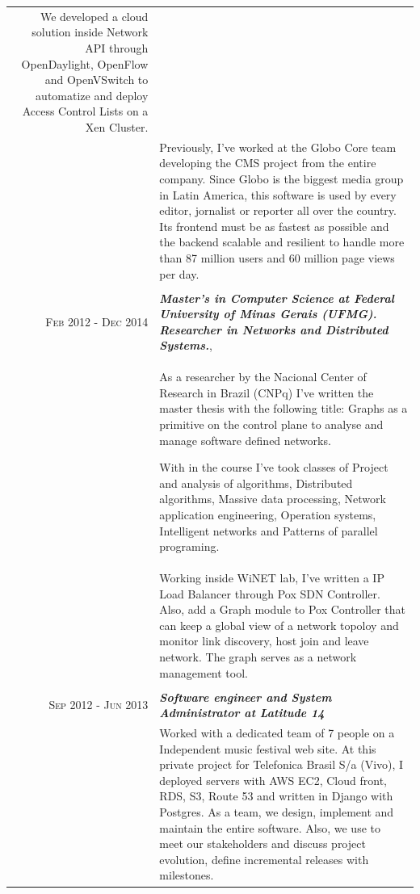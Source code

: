 \documentclass[a4paper,10pt]{article} %
\begin{document}
\begin{longtable}{r|p{11cm}}
{    We developed a cloud solution inside Network API through OpenDaylight,
    OpenFlow and OpenVSwitch to automatize and deploy Access Control Lists on a
    Xen Cluster.} \\

& \footnotesize{
    Previously, I've worked at the Globo Core team developing the CMS project
    from the entire company. Since Globo is the biggest media group in Latin
    America, this software is used by every editor, jornalist or reporter all
    over the country. Its frontend must be as fastest as possible and the
    backend scalable and resilient to handle more than 87 million users and 60
    million page views per day.} \\
\multicolumn{2}{c}{} \\


\textsc{Feb 2012 - Dec 2014} & \emph{\bf Master's in Computer Science at
Federal University of Minas Gerais (UFMG). Researcher in
Networks and Distributed Systems.}, \\
& \footnotesize{As a researcher by the Nacional Center of Research in Brazil
    (CNPq) I've written the master thesis with the following title: Graphs as
    a primitive on the control plane to analyse and manage software defined
    networks.

    With in the course I've took classes of Project and analysis of algorithms,
    Distributed algorithms, Massive data processing, Network application
    engineering, Operation systems, Intelligent networks and Patterns of
    parallel programing.} \\

& \footnotesize{
    Working inside WiNET lab, I've written a IP Load Balancer through Pox SDN
    Controller. Also, add a Graph module to
    Pox Controller that can keep a global view of a network topoloy and monitor
    link discovery, host join and leave network. The graph serves as a network
    management tool.} \\
\multicolumn{2}{c}{} \\


\textsc{Sep 2012 - Jun 2013} & \emph{\bf Software engineer and System
Administrator at Latitude 14} \\
& \footnotesize{Worked with a dedicated team of 7 people on a Independent
	music festival web site. At this private project for Telefonica Brasil
	S/a (Vivo), I deployed servers with AWS EC2, Cloud front, RDS, S3,
	Route 53 and written in Django with Postgres. As a team, we design,
	implement and maintain the entire software. Also, we use to meet our
	stakeholders and discuss project evolution, define incremental releases
	with milestones.} \\


\end{longtable}
\end{document}

